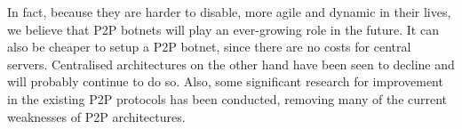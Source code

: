 \documentclass{llncs}
\begin{document}
In fact, because they are harder to disable, more agile and dynamic in
their lives, we believe that P2P botnets will play an ever-growing
role in the future. It can also be cheaper to setup a P2P botnet,
since there are no costs for central servers. Centralised
architectures on the other hand have been seen to decline and will
probably continue to do so. Also, some significant research for
improvement in the existing P2P protocols has been conducted,
removing many of the current weaknesses of P2P architectures.




\end{document}
